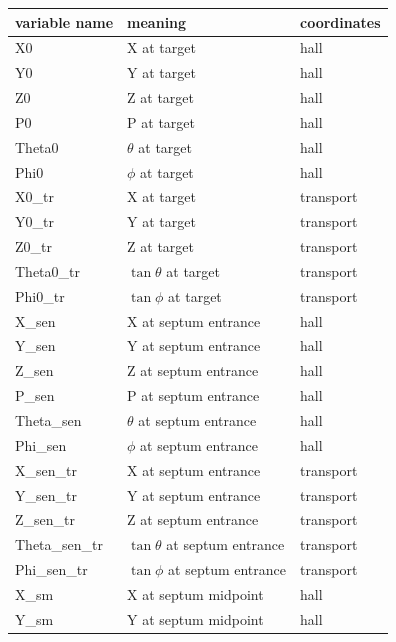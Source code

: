 \documentclass[11pt]{amsart}
\begin{document}
\begin{longtable}{| l | l | l |}
\hline
\textbf{variable name}   & \textbf{meaning} & \textbf{coordinates} \\
\hline
X0              & X at target &  hall \\
\hline
Y0              & Y at target & hall \\
\hline
Z0              & Z at target & hall \\
\hline
P0              & P at target & hall \\
\hline
Theta0          & $\theta$ at target & hall \\
\hline
Phi0            & $\phi$ at target & hall \\
\hline
X0\_tr           & X at target & transport \\
\hline
Y0\_tr           & Y at target & transport \\
\hline
Z0\_tr           & Z at target & transport \\
\hline
Theta0\_tr       & $\tan{\theta}$ at target & transport \\
\hline
Phi0\_tr         & $\tan{\phi}$ at target & transport \\
\hline
\hline
X\_sen              & X at septum entrance  & hall \\
\hline
Y\_sen              & Y at septum entrance  & hall \\
\hline
Z\_sen              & Z at septum entrance  & hall \\
\hline
P\_sen              & P at septum entrance  & hall \\
\hline
Theta\_sen          & $\theta$ at septum entrance  & hall \\
\hline
Phi\_sen            & $\phi$ at septum entrance  & hall \\
\hline
X\_sen\_tr           & X at septum entrance  & transport\\
\hline
Y\_sen\_tr           & Y at septum entrance  & transport\\
\hline
Z\_sen\_tr           & Z at septum entrance  & transport\\
\hline
Theta\_sen\_tr       & $\tan{\theta}$ at septum entrance  & transport\\
\hline
Phi\_sen\_tr         & $\tan{\phi}$ at septum entrance  & transport\\
\hline
\hline
X\_sm              & X at septum midpoint  & hall \\
\hline
Y\_sm              & Y at septum midpoint  & hall \\

\end{longtable}
\end{document}
